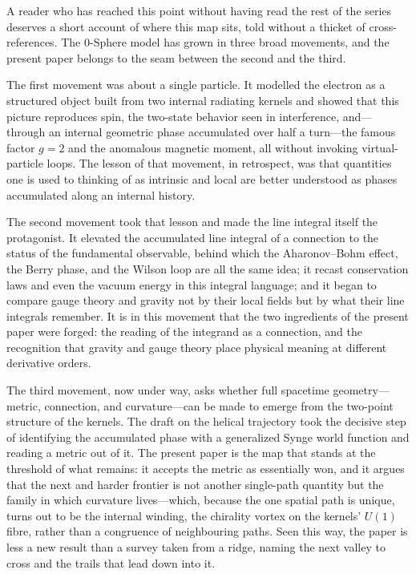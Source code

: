 \documentclass[%
 reprint, amsmath,amssymb, aps, prb, ]{revtex4-2}
\numberwithin{equation}{section}
\begin{document}
A reader who has reached this point without having read the rest of the series deserves a short account of where this map sits, told without a thicket of cross-references. The 0-Sphere model has grown in three broad movements, and the present paper belongs to the seam between the second and the third.

The first movement was about a single particle. It modelled the electron as a structured object built from two internal radiating kernels and showed that this picture reproduces spin, the two-state behavior seen in interference, and---through an internal geometric phase accumulated over half a turn---the famous factor $g=2$ and the anomalous magnetic moment, all without invoking virtual-particle loops. The lesson of that movement, in retrospect, was that quantities one is used to thinking of as intrinsic and local are better understood as phases accumulated along an internal history.

The second movement took that lesson and made the line integral itself the protagonist. It elevated the accumulated line integral of a connection to the status of the fundamental observable, behind which the Aharonov--Bohm effect, the Berry phase, and the Wilson loop are all the same idea; it recast conservation laws and even the vacuum energy in this integral language; and it began to compare gauge theory and gravity not by their local fields but by what their line integrals remember. It is in this movement that the two ingredients of the present paper were forged: the reading of the integrand as a connection, and the recognition that gravity and gauge theory place physical meaning at different derivative orders.

The third movement, now under way, asks whether full spacetime geometry---metric, connection, and curvature---can be made to emerge from the two-point structure of the kernels. The draft on the helical trajectory took the decisive step of identifying the accumulated phase with a generalized Synge world function and reading a metric out of it. The present paper is the map that stands at the threshold of what remains: it accepts the metric as essentially won, and it argues that the next and harder frontier is not another single-path quantity but the family in which curvature lives---which, because the one spatial path is unique, turns out to be the internal winding, the chirality vortex on the kernels' $U(1)$ fibre, rather than a congruence of neighbouring paths. Seen this way, the paper is less a new result than a survey taken from a ridge, naming the next valley to cross and the trails that lead down into it.
\end{document}

